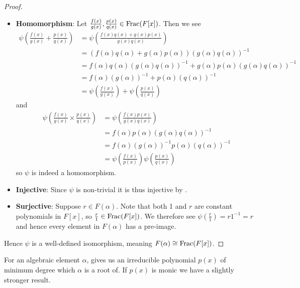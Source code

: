 \begin{proof}
\begin{itemize}
        \item \textbf{Homomorphism}: Let $\frac{f(x)}{g(x)}, \frac{p(x)}{q(x)} \in \mathrm{Frac}(F[x])$. Then we see
        \begin{align*}
            \psi\left(\frac{f(x)}{g(x)} + \frac{p(x)}{q(x)}\right) &= \psi\left(\frac{f(x)q(x) + g(x)p(x)}{g(x)q(x)}\right)\\
            &= \left(f(\alpha)q(\alpha) + g(\alpha)p(\alpha)\right)\left(g(\alpha)q(\alpha)\right)^{-1}\\
            &= f(\alpha)q(\alpha)\left(g(\alpha)q(\alpha)\right)^{-1} + g(\alpha)p(\alpha)\left(g(\alpha)q(\alpha)\right)^{-1}\\
            &= f(\alpha)(g(\alpha))^{-1} + p(\alpha)(q(\alpha))^{-1}\\
            &= \psi\left(\frac{f(x)}{g(x)}\right) + \psi\left(\frac{p(x)}{q(x)}\right)
        \end{align*}
        and
        \begin{align*}
            \psi\left(\frac{f(x)}{g(x)}\times \frac{p(x)}{q(x)}\right) &= \psi\left(\frac{f(x)p(x)}{g(x)q(x)}\right)\\
            &= f(\alpha)p(\alpha)\left(g(\alpha)q(\alpha)\right)^{-1}\\
            &= f(\alpha)(g(\alpha))^{-1}p(\alpha)(q(\alpha))^{-1}\\
            &= \psi\left(\frac{f(x)}{p(x)}\right)\psi\left(\frac{p(x)}{q(x)}\right)
        \end{align*}
        so $\psi$ is indeed a homomorphism.

        \item \textbf{Injective}: Since $\psi$ is non-trivial it is thus injective by .

        \item \textbf{Surjective}: Suppose $r \in F(\alpha)$. Note that both  1 and $r$ are constant polynomials in $F[x]$, so $\frac r1 \in \mathrm{Frac}(F[x])$. We therefore see $\psi\left(\frac r1\right) = r1^{-1} = r$ and hence every element in $F(\alpha)$ has a pre-image.
    \end{itemize}
    Hence $\psi$ is a well-defined isomorphism, meaning $F(\alpha) \cong \mathrm{Frac}(F[x])$.
\end{proof}

For an algebraic element $\alpha$,  gives us an irreducible polynomial $p(x)$ of minimum degree which $\alpha$ is a root of. If $p(x)$ is monic we have a slightly stronger result.

